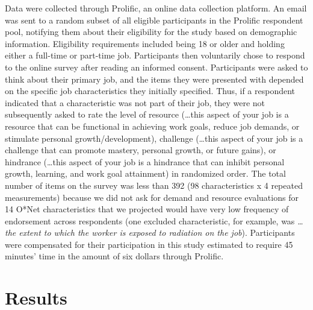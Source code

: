 \documentclass[
  jou,mask]{apa6}
\begin{document}
Data were collected through Prolific, an online data collection platform. An email was sent to a random subset of all eligible participants in the Prolific respondent pool, notifying them about their eligibility for the study based on demographic information. Eligibility requirements included being 18 or older and holding either a full-time or part-time job. Participants then voluntarily chose to respond to the online survey after reading an informed consent. Participants were asked to think about their primary job, and the items they were presented with depended on the specific job characteristics they initially specified. Thus, if a respondent indicated that a characteristic was not part of their job, they were not subsequently asked to rate the level of resource (\ldots this aspect of your job is a resource that can be functional in achieving work goals, reduce job demands, or stimulate personal growth/development), challenge (\ldots this aspect of your job is a challenge that can promote mastery, personal growth, or future gains), or hindrance (\ldots this aspect of your job is a hindrance that can inhibit personal growth, learning, and work goal attainment) in randomized order. The total number of items on the survey was less than 392 (98 characteristics x 4 repeated measurements) because we did not ask for demand and resource evaluations for 14 O*Net characteristics that we projected would have very low frequency of endorsement across respondents (one excluded characteristic, for example, was \emph{\ldots the extent to which the worker is exposed to radiation on the job}). Participants were compensated for their participation in this study estimated to require 45 minutes' time in the amount of six dollars through Prolific.

\hypertarget{results}{%
\section{Results}\label{results}}
\end{document}
